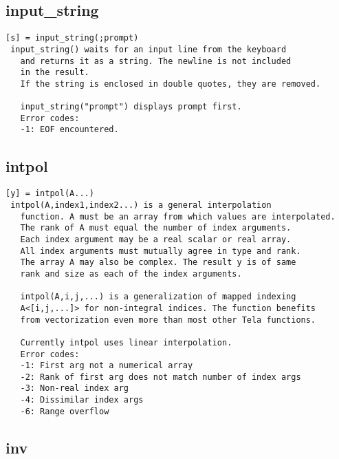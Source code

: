 \documentclass[a4paper]{article}
\begin{document}
\subsection{input\_string\label{input_string}}

\begin{tscreen}
\begin{verbatim}
[s] = input_string(;prompt)
 input_string() waits for an input line from the keyboard
   and returns it as a string. The newline is not included
   in the result.
   If the string is enclosed in double quotes, they are removed.

   input_string("prompt") displays prompt first.
   Error codes:
   -1: EOF encountered. 
\end{verbatim}
\end{tscreen}





\subsection{intpol\label{intpol}}

\begin{tscreen}
\begin{verbatim}
[y] = intpol(A...)
 intpol(A,index1,index2...) is a general interpolation
   function. A must be an array from which values are interpolated.
   The rank of A must equal the number of index arguments.
   Each index argument may be a real scalar or real array.
   All index arguments must mutually agree in type and rank.
   The array A may also be complex. The result y is of same
   rank and size as each of the index arguments.

   intpol(A,i,j,...) is a generalization of mapped indexing
   A<[i,j,...]> for non-integral indices. The function benefits
   from vectorization even more than most other Tela functions.

   Currently intpol uses linear interpolation.
   Error codes:
   -1: First arg not a numerical array
   -2: Rank of first arg does not match number of index args
   -3: Non-real index arg
   -4: Dissimilar index args
   -6: Range overflow
\end{verbatim}
\end{tscreen}





\subsection{inv\label{inv}}
\end{document}
